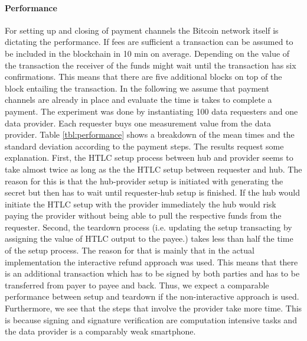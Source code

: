 \paragraph{Performance}

For setting up and closing of payment channels the Bitcoin network itself is dictating the performance. If fees are sufficient a transaction can be assumed to be included in the blockchain in 10 min on average. Depending on the value of the transaction the receiver of the funds might wait until the transaction has six confirmations. This means that there are five additional blocks on top of the block entailing the transaction. 
In the following we assume that payment channels are already in place and evaluate the time is takes to complete a payment. The experiment was done by instantiating 100 data requesters and one data provider. Each requester buys one measurement value from the data provider. Table \ref{tbl:performance} shows a breakdown of the mean times and the standard deviation according to the payment steps. The results request some explanation. First, the HTLC setup process between hub and provider seems to take almost twice as long as the the HTLC setup between requester and hub. The reason for this is that the hub-provider setup is initiated with generating the secret but then has to wait until requester-hub setup is finished. If the hub would initiate the HTLC setup with the provider immediately the hub would risk paying the provider without being able to pull the respective funds from the requester. Second, the teardown process (i.e. updating the setup transacting by assigning the value of HTLC output to the payee.) takes less than half the time of the setup process. The reason for that is mainly that in the actual implementation the interactive refund approach was used. This means that there is an additional transaction which has to be signed by both parties and has to be transferred from payer to payee and back. Thus, we expect a comparable performance between setup and teardown if the non-interactive approach is used. Furthermore, we see that the steps that involve the provider take more time. This is because signing and signature verification are computation intensive tasks and the data provider is a comparably weak smartphone.

